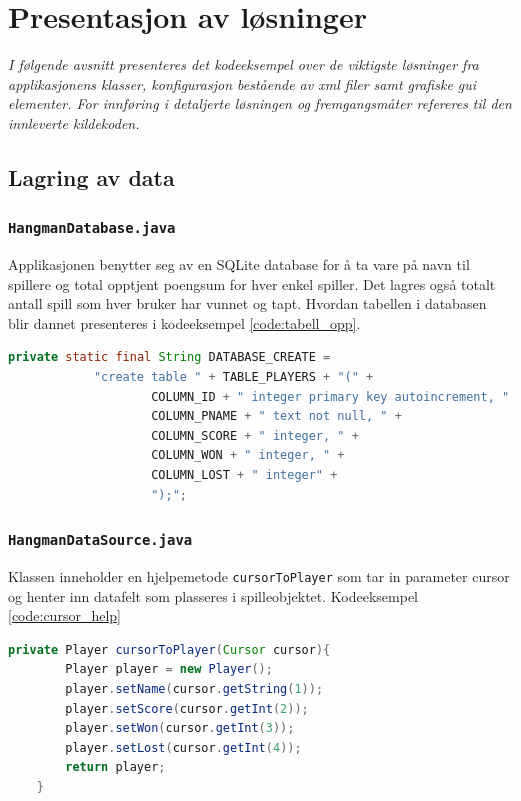 \chapter{Presentasjon av løsninger}
\emph{I følgende avsnitt presenteres det kodeeksempel over de viktigste løsninger fra applikasjonens klasser, konfigurasjon bestående av xml filer samt grafiske gui elementer. For innføring i detaljerte løsningen og fremgangsmåter refereres til den innleverte kildekoden.}
\section{Lagring av data}

\subsection{\texttt{HangmanDatabase.java}}
Applikasjonen benytter seg av en SQLite database for å ta vare på navn til spillere og total opptjent poengsum for hver enkel spiller. Det lagres også totalt antall spill som hver bruker har vunnet og tapt. Hvordan tabellen i databasen blir dannet presenteres i kodeeksempel \ref{code:tabell_opp}.

\begin{lstlisting}[language=Java, caption=Script for opprettelse av tabell, label=code:tabell_opp]
 private static final String DATABASE_CREATE =
            "create table " + TABLE_PLAYERS + "(" +
                    COLUMN_ID + " integer primary key autoincrement, " +
                    COLUMN_PNAME + " text not null, " +
                    COLUMN_SCORE + " integer, " +
                    COLUMN_WON + " integer, " +
                    COLUMN_LOST + " integer" +
                    ");";
\end{lstlisting}


\subsection{\texttt{HangmanDataSource.java}}
Klassen inneholder en hjelpemetode \texttt{cursorToPlayer} som tar in parameter cursor og henter inn datafelt som plasseres i spilleobjektet. Kodeeksempel \ref{code:cursor_help}

\begin{lstlisting}[language=Java, caption=Hjelpemetode for plasering av cursor, label=code:cursor_help]
private Player cursorToPlayer(Cursor cursor){
        Player player = new Player();
        player.setName(cursor.getString(1));
        player.setScore(cursor.getInt(2));
        player.setWon(cursor.getInt(3));
        player.setLost(cursor.getInt(4));
        return player;
    }
\end{lstlisting}


